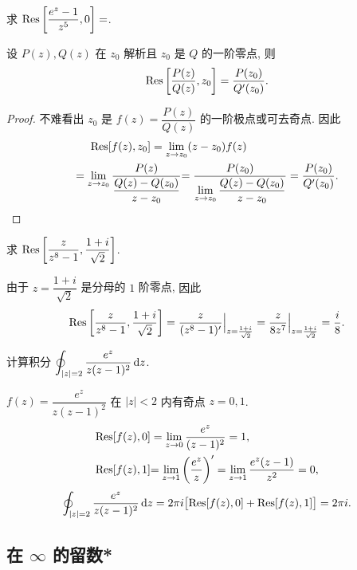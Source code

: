 \documentclass[nocolor,theme=doremi,lang=cn,11pt,chinese,twoside,openright,usesamecnt]{elegantbook}
\newenvironment{alertblock}[1]{\begin{tcolorbox}[alertstyle,title=#1]}{\end{tcolorbox}}
\newcommand\peq{\mathrel{\phantom{=}}} %
\begin{document}
\begin{exercise}
		求 ${\mathrm{Res}}\left[\dfrac{e^z-1}{z^5},0\right]=$.
\end{exercise}

\begin{alertblock}{极点留数计算公式 III}
	设 $P(z),Q(z)$ 在 $z_0$ 解析且 $z_0$ 是 $Q$ 的一阶零点, 则
	\[{\mathrm{Res}}\left[\frac{P(z)}{Q(z)},z_0\right]=\frac{P(z_0)}{Q'(z_0)}.\]
\end{alertblock}

\begin{proof}
		不难看出 $z_0$ 是 $f(z)=\dfrac{P(z)}{Q(z)}$ 的一阶极点或可去奇点.
	{因此
		\begin{align*}
			&\peq\Res[f(z),z_0]=\lim_{z\to z_0}(z-z_0)f(z)\\
			&{=\lim_{z\to z_0}\frac{P(z)}{\dfrac{Q(z)-Q(z_0)}{z-z_0}}}
			{=\frac{P(z_0)}{\lim\limits_{z\to z_0}\dfrac{Q(z)-Q(z_0)}{z-z_0}}=\frac{P(z_0)}{Q'(z_0)}.\qedhere}
		\end{align*}
	}
\end{proof}

\begin{example}
	求 ${\mathrm{Res}}\left[\dfrac{z}{z^8-1},\dfrac{1+i}{\sqrt2}\right]$.
\end{example}

\begin{solution}
		由于 $z=\dfrac{1+i}{\sqrt2}$ 是分母的 $1$ 阶零点,
	{因此
		\[{\mathrm{Res}}\left[\frac z{z^8-1},\frac{1+i}{\sqrt2}\right]
		=\frac z{(z^8-1)'}\Big|_{z=\frac{1+i}{\sqrt2}}
		=\frac z{8z^7}\Big|_{z=\frac{1+i}{\sqrt2}}
		=\frac i8.\]
	}
\end{solution}


\begin{example}
	计算积分 $\displaystyle\oint_{|z|=2}\frac{e^z}{z(z-1)^2}\,\mathrm{d} z$.
\end{example}

\begin{solution}
		$f(z)=\dfrac{e^z}{z(z-1)^2}$ 在 $|z|<2$ 内有奇点 $z=0,1$.
	{\begin{align*}
		{\mathrm{Res}}[f(z),0]&=\lim_{z\to0}\frac{e^z}{(z-1)^2}=1,\\
		{{\mathrm{Res}}[f(z),1]}&{=\lim_{z\to1}\left(\frac{e^z}z\right)'=\lim_{z\to1}\frac{e^z(z-1)}{z^2}=0,}
	\end{align*}\[\oint_{|z|=2}\frac{e^z}{z(z-1)^2}\,\mathrm{d} z
		=2\pi i\bigl[{\mathrm{Res}}[f(z),0]+{\mathrm{Res}}[f(z),1]\bigr]
		=2\pi i.\]
	}
\end{solution}

\subsection{在 \texorpdfstring{$\infty$}{∞} 的留数*}
\end{document}
